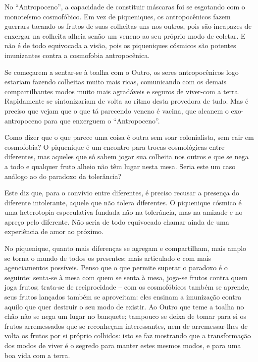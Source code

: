 No \enquote{Antropoceno}, a capacidade de constituir máscaras foi se esgotando com o monoteísmo cosmofóbico. Em vez de piqueniques, os antropocênicos fazem guerrars tacando os frutos de suas colheitas uns nos outros, pois são incapazes de enxergar na colheita alheia senão um veneno ao seu próprio modo de coletar. E não é de todo equivocada a visão, pois os piqueniques cósmicos são potentes imunizantes contra a cosmofobia antropocênica.

Se começarem a sentar-se à toalha com o Outro, os seres antropocênicos logo estariam fazendo colheitas muito mais ricas, comunicando com os demais compartilhantes modos muito mais agradáveis e seguros de viver-com a terra. Rapidamente se sintonizariam de volta ao ritmo desta provedora de tudo. Mas é preciso que vejam que o que tá parecendo veneno é vacina, que alcanem o exo-antropoceno para que enxerguem o \enquote{Antropoceno}.


Como dizer que o que parece uma coisa é outra sem soar colonialista, sem cair em cosmofobia? O piquenique é um encontro para trocas cosmológicas entre diferentes, mas aqueles que só sabem jogar sua colheita nos outros e que se nega a todo e qualquer fruto alheio não têm lugar nesta mesa. Seria este um caso análogo ao do paradoxo da tolerância?

Este diz que, para o convívio entre diferentes, é preciso recusar a presença do diferente intolerante, aquele que não tolera diferentes. O piquenique cósmico é uma heterotopia especulativa fundada não  na tolerância, mas na amizade e no apreço pelo diferente. Não seria de todo equivocado chamar ainda de uma experiência de amor ao próximo.

No piquenique, quanto mais diferenças se agregam e compartilham, mais amplo se torna o mundo de todos os presentes; mais articulado e com mais agenciamentos possíveis. Penso que o que permite superar o paradoxo é o seguinte: senta-se à mesa com quem se senta à mesa, joga-se frutos contra quem joga frutos; trata-se de reciprocidade -- com os cosmofóbicos também se aprende, seus frutos lançados também se aproveitam: eles ensinam a imunização contra aquilo que quer destruir o seu modo de existir. Ao Outro que teme a toalha no chão não se nega um lugar no banquete; tampouco se deixa de tomar para si os frutos arremessados que se reconheçam interessantes, nem de arremessar-lhes de volta os frutos por si próprio colhidos: isto se faz mostrando que a transformação dos modos de viver é o segredo para manter estes mesmos modos, e para uma boa vida com a terra.

